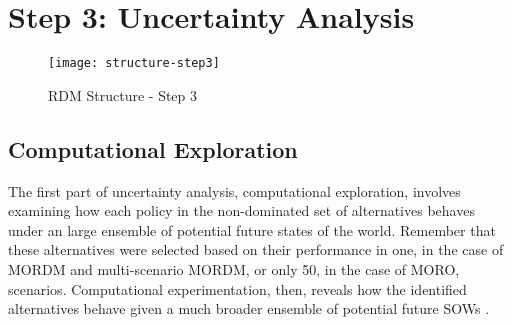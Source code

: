 \chapter{Step 3: Uncertainty Analysis}\label{dev-step3}

\begin{abstract}
    Step 3 of an RDM-based analysis examines the performance of the set of non-dominated policy alternatives discovered during the policy alternative determination step across a large set of potential future states of the world (SOWs). This step is common for all three methods under consideration, with the only difference being that uncertainty analysis is repeated for each reference scenario used in multi-scenario MORDM. The first element of uncertainty analysis, computational exploration, is described in \cref{step3-explore}. In addition to exploring how each policy alternative responds to a variety of potential SOWs, the uncertainty analysis phase includes calculating the robustness of each policy based on the results of that exploration, which is discussed in \cref{step3-robust}.
\end{abstract}

\medskip

\begin{figure}[h]
    \centering
    \captionsetup{justification=centering}
    
    \texttt{[image: structure-step3]}
    \caption{RDM Structure - Step 3}
    \label{fig:structure-step3}
\end{figure}

\newpage

\section{Computational Exploration}\label{step3-explore}
The first part of uncertainty analysis, computational exploration, involves examining how each policy in the non-dominated set of alternatives behaves under an large ensemble of potential future states of the world. Remember that these alternatives were selected based on their performance in one, in the case of MORDM and multi-scenario MORDM, or only 50, in the case of MORO, scenarios. Computational experimentation, then, reveals how the identified alternatives behave given a much broader ensemble of potential future SOWs \citep{Kasprzyk2013}. 

